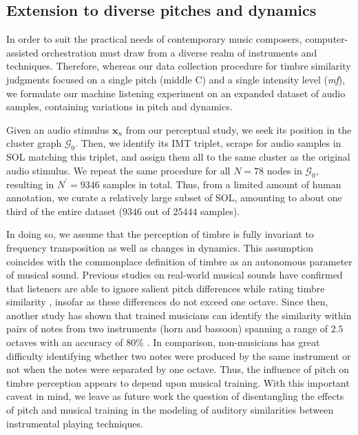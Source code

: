 \documentclass{bmcart}
\begin{document}



\subsection*{Extension to diverse pitches and dynamics}

In order to suit the practical needs of contemporary music composers, computer-assisted orchestration must draw from a diverse realm of instruments and techniques.
Therefore, whereas our data collection procedure for timbre similarity judgments focused on a single pitch (middle C) and a single intensity level (\emph{mf}), we formulate our machine listening experiment on an expanded dataset of audio samples, containing variations in pitch and dynamics.

Given an audio stimulus $\boldsymbol{x}_n$ from our perceptual study, we seek its position in the cluster graph $\mathcal{G}_0$.
Then, we identify its IMT triplet, scrape for audio samples in SOL matching this triplet, and assign them all to the same cluster as the original audio stimulus.
We repeat the same procedure for all $N=78$ nodes in $\mathcal{G}_0$, resulting in $N^\prime = 9346$ samples in total.
Thus, from a limited amount of human annotation, we curate a relatively large subset of SOL, amounting to about one third of the entire dataset ($9346$ out of $25444$ samples).

In doing so, we assume that the perception of timbre is fully invariant to frequency transposition as well as changes in dynamics.
This assumption coincides with the commonplace definition of timbre as an autonomous parameter of musical sound.
Previous studies on real-world musical sounds have confirmed that listeners are able to ignore salient pitch differences while rating timbre similarity \cite{handel2001musicperception,marozeau2003dependency}, insofar as these differences do not exceed one octave.
Since then, another study has shown that trained musicians can identify the similarity within pairs of notes from two instruments (horn and bassoon) spanning a range of $2.5$ octaves with an accuracy of $80\%$ \cite{steele2006musicperception}.
In comparison, non-musicians has great difficulty identifying whether two notes were produced by the same instrument or not when the notes were separated by one octave.
Thus, the influence of pitch on timbre perception appears to depend upon musical training.
With this important caveat in mind, we leave as future work the question of disentangling the effects of pitch and musical training in the modeling of auditory similarities between instrumental playing techniques.
\end{document}
